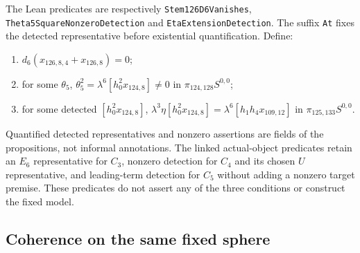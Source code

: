 \begin{definition}
  \label{def:near126-conditions}
  \notready
  The Lean predicates are respectively \texttt{Stem126D6Vanishes},
  \texttt{Theta5SquareNonzeroDetection} and
  \texttt{EtaExtensionDetection}. The suffix \texttt{At} fixes the
  detected representative before existential quantification.
  Define:
  \begin{enumerate}
    \item[$C_3$:] $d_6(x_{126,8,4}+x_{126,8})=0$;
    \item[$C_4$:] for some $\theta_5$,
      $\theta_5^2=\lambda^6[h_0^2x_{124,8}]\ne0$ in
      $\pi_{124,128}S^{0,0}$;
    \item[$C_5$:] for some detected $[h_0^2x_{124,8}]$,
      $\lambda^3\eta[h_0^2x_{124,8}]
       =\lambda^6[h_1h_4x_{109,12}]$ in
      $\pi_{125,133}S^{0,0}$.
  \end{enumerate}
  Quantified detected representatives and nonzero assertions are fields of the
  propositions, not informal annotations.
  The linked actual-object predicates retain an $E_6$ representative for
  $C_3$, nonzero detection for $C_4$ and its chosen $U$ representative, and
  leading-term detection for $C_5$ without adding a nonzero target premise.
  These predicates do not assert any of the three conditions or construct
  the fixed model.
\end{definition}

\subsection{Coherence on the same fixed sphere}

